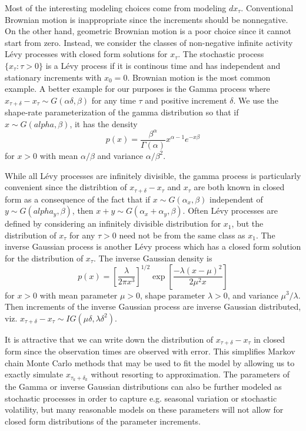 \documentclass{article}
\begin{document}
Most of the interesting modeling choices come from modeling $dx_\tau$. Conventional Brownian motion is inappropriate since the increments should be nonnegative. On the other hand, geometric Brownian motion is a poor choice since it cannot start from zero. Instead, we consider the classes of non-negative infinite activity L\'{e}vy processes with closed form solutions for $x_{\tau}$. The stochastic process $\{x_{\tau}:\tau>0\}$ is a L\'{e}vy process if it is continous time and has independent and stationary increments with $x_0=0$. Brownian motion is the most common example. A better example for our purposes is the Gamma process where $x_{\tau + \delta} - x_{\tau} \sim G(\alpha \delta, \beta)$ for any time $\tau$ and positive increment $\delta$. We use the shape-rate parameterization of the gamma distribution so that if $x\sim G(alpha,\beta)$, it has the density
\[
p(x) = \frac{\beta^\alpha}{\Gamma(\alpha)}x^{\alpha-1}e^{-x\beta}
\]
for $x>0$ with mean $\alpha/\beta$ and variance $\alpha/\beta^2$. 

While all L\'{e}vy processes are infinitely divisible, the gamma process is particularly convenient since the distribtion of $x_{\tau+\delta} - x_\tau$ and $x_\tau$ are both known in closed form as a consequence of the fact that if $x\sim G(\alpha_x,\beta)$ independent of $y\sim G(alpha_y,\beta)$, then $x+y \sim G(\alpha_x + \alpha_y, \beta)$. Often L\'{e}vy processes are defined by considering an infinitely divisible distribution for $x_1$, but the distribution of $x_{\tau}$ for any $\tau>0$ need not be from the same class as $x_1$. The inverse Gaussian process is another L\'{e}vy process which has a closed form solution for the distribution of $x_\tau$. The inverse Gaussian density is
\[
p(x) = \left[\frac{\lambda}{2\pi x^3}\right]^{1/2}\exp\left[\frac{-\lambda(x - \mu)^2}{2\mu^2x}\right]
\]
for $x>0$ with mean parameter $\mu>0$, shape parameter $\lambda>0$, and variance $\mu^3/\lambda$. Then increments of the inverse Gaussian process are inverse Gaussian distributed, viz. $x_{\tau + \delta} - x_\tau \sim IG(\mu\delta,\lambda\delta^2)$. 

It is attractive that we can write down the distribution of $x_{\tau + \delta} - x_\tau$ in closed form since the observation times are observed with error. This simplifies Markov chain Monte Carlo methods that may be used to fit the model by allowing us to exactly simulate $x_{\tau_k + \delta_k}$ without resorting to approximation. The parameters of the Gamma or inverse Gaussian distributions can also be further modeled as stochastic processes in order to capture e.g. seasonal variation or stochastic volatility, but many reasonable models on these parameters will not allow for closed form distributions of the parameter increments. 
\end{document}
